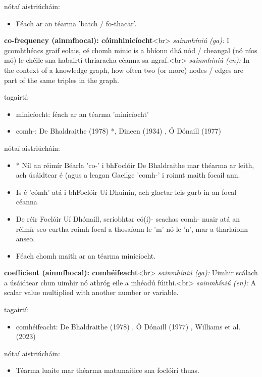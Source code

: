 \documentclass{article}
\begin{document}
nótaí aistriúcháin:
\begin{itemize}
	\item Féach ar an téarma 'batch / fo-thacar'.
\end{itemize}


\textbf{co-frequency (ainmfhocal): cóimhinicíocht}<br>
\textit{sainmhíniú (ga):} I gcomhthéacs graif eolais, cé chomh minic is a bhíonn dhá nód / cheangal (nó níos mó) le chéile sna habairtí thriaracha céanna sa ngraf.<br>
\textit{sainmhíniú (en):} In the context of a knowledge graph, how often two (or more) nodes / edges are part of the same triples in the graph.

tagairtí:
\begin{itemize}
	\item minicíocht: féach ar an téarma 'minicíocht'
	\item comh-: De Bhaldraithe (1978) \cite{de-bhaldraithe}*, Dineen (1934) \cite{dineen}, Ó Dónaill (1977) \cite{odonaill}
\end{itemize}

nótaí aistriúcháin:
\begin{itemize}
	\item * Níl an réimír Béarla 'co-' i bhFoclóir De Bhaldraithe mar théarma ar leith, ach úsáidtear é (agus a leagan Gaeilge 'comh-' i roinnt maith focail ann.
	\item Is é 'cómh' atá i bhFoclóir Uí Dhuinín, ach glactar leis gurb in an focal céanna
	\item De réir Foclóir Uí Dhónaill, scríobhtar có(i)- seachas comh- nuair atá an réimír seo curtha roimh focal a thosaíonn le 'm' nó le 'n', mar a tharlaíonn anseo.
	\item Féach chomh maith ar an téarma minicíocht.
\end{itemize}


\textbf{coefficient (ainmfhocal): comhéifeacht}<br>
\textit{sainmhíniú (ga):} Uimhir scálach a úsáidtear chun uimhir nó athróg eile a mhéadú fúithi.<br>
\textit{sainmhíniú (en):} A scalar value multiplied with another number or variable.

tagairtí:
\begin{itemize}
	\item comhéifeacht: De Bhaldraithe (1978) \cite{de-bhaldraithe}, Ó Dónaill (1977) \cite{odonaill}, Williams et al. (2023) \cite{storchiste}
\end{itemize}

nótaí aistriúcháin:
\begin{itemize}
	\item Téarma luaite mar théarma matamaitice sna foclóirí thuas.
\end{itemize}
\end{document}
